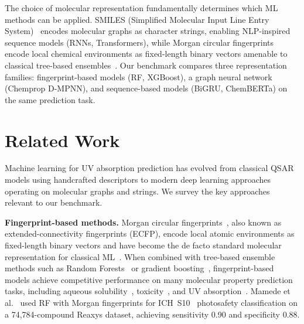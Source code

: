 \documentclass[11pt,a4paper]{article}
\begin{document}
The choice of molecular representation fundamentally determines which ML methods can be applied.
SMILES (Simplified Molecular Input Line Entry System)~\cite{weininger1988smiles} encodes molecular graphs as character strings, enabling NLP-inspired sequence models (RNNs, Transformers), while Morgan circular fingerprints~\cite{rogers2010extended} encode local chemical environments as fixed-length binary vectors amenable to classical tree-based ensembles~\cite{landrum2016rdkit, wuMoleculeNet2018}.
Our benchmark compares three representation families: fingerprint-based models (RF, XGBoost), a graph neural network (Chemprop D-MPNN), and sequence-based models (BiGRU, ChemBERTa) on the same prediction task.

\section{Related Work}
\label{sec:related_work}

Machine learning for UV absorption prediction has evolved from classical QSAR models using handcrafted descriptors to modern deep learning approaches operating on molecular graphs and strings.
We survey the key approaches relevant to our benchmark.

\textbf{Fingerprint-based methods.}
Morgan circular fingerprints~\cite{rogers2010extended}, also known as extended-connectivity fingerprints (ECFP), encode local atomic environments as fixed-length binary vectors and have become the de facto standard molecular representation for classical ML~\cite{wuMoleculeNet2018}.
When combined with tree-based ensemble methods such as Random Forests~\cite{breiman2001random} or gradient boosting~\cite{chen2016xgboost}, fingerprint-based models achieve competitive performance on many molecular property prediction tasks, including aqueous solubility~\cite{delaney2004esol, panapitiya2022evaluation}, toxicity~\cite{mayr2016deeptox}, and UV absorption~\cite{mamede2021machine}.
Mamede et al.~\cite{mamede2021machine} used RF with Morgan fingerprints for ICH~S10~\cite{ICH2013S10} photosafety classification on a 74,784-compound Reaxys dataset, achieving sensitivity 0.90 and specificity 0.88.
\end{document}
